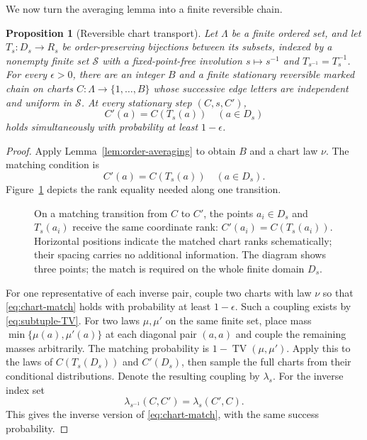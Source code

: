 \documentclass[11pt]{article}
\newtheorem{proposition}[theorem]{Proposition}
\theoremstyle{definition}
\theoremstyle{remark}
\newcommand{\cS}{\mathcal S}
\newcommand{\TV}{\operatorname{TV}}
\begin{document}
We now turn the averaging lemma into a finite reversible chain.
\begin{proposition}[Reversible chart transport]\label{prop:chart-transport}
Let $\Lambda$ be a finite ordered set, and let
$T_s:D_s\to R_s$ be order-preserving bijections between its subsets,
indexed by a nonempty finite set $\cS$ with a fixed-point-free involution
$s\mapsto s^{-1}$ and $T_{s^{-1}}=T_s^{-1}$.
For every $\epsilon>0$, there are an integer $B$ and a finite stationary
reversible marked chain on charts $C:\Lambda\to\{1,\ldots,B\}$ whose
successive edge letters are independent and uniform in $\cS$.
At every stationary step $(C,s,C')$,
\[
 C'(a)=C(T_s(a))\quad(a\in D_s)
\]
holds simultaneously with probability at least $1-\epsilon$.
\end{proposition}

\begin{proof}
Apply Lemma~\ref{lem:order-averaging} to obtain $B$ and a chart law
$\nu$. The matching condition is
\begin{equation}\label{eq:chart-match}
 C'(a)=C(T_s(a))\quad(a\in D_s).
\end{equation}
Figure~\ref{fig:chart-transport} depicts the rank equality needed along
one transition.
\begin{figure}[H]
 \centering
 
 \caption{On a matching transition from $C$ to $C'$, the points
 $a_i\in D_s$ and $T_s(a_i)$ receive the same coordinate rank:
 $C'(a_i)=C(T_s(a_i))$. Horizontal positions indicate the matched
 chart ranks schematically; their spacing carries no additional information.
 The diagram shows three points; the match
 is required on the whole finite domain $D_s$.}
 \label{fig:chart-transport}
\end{figure}
For one representative of each inverse pair, couple two charts with
law $\nu$ so that \eqref{eq:chart-match} holds with probability at least
$1-\epsilon$.
Such a coupling exists by \eqref{eq:subtuple-TV}. For two laws $\mu,\mu'$
on the same finite set, place mass $\min\{\mu(a),\mu'(a)\}$ at each
diagonal pair $(a,a)$ and couple the remaining masses arbitrarily.
The matching probability is $1-\TV(\mu,\mu')$.
Apply this to the laws of $C(T_s(D_s))$ and $C'(D_s)$, then sample the
full charts from their conditional distributions.
Denote the resulting coupling by $\lambda_s$.
For the inverse index set
\[
 \lambda_{s^{-1}}(C,C')=\lambda_s(C',C).
\]
This gives the inverse version of \eqref{eq:chart-match}, with the same
success probability.


\end{proof}
\end{document}
